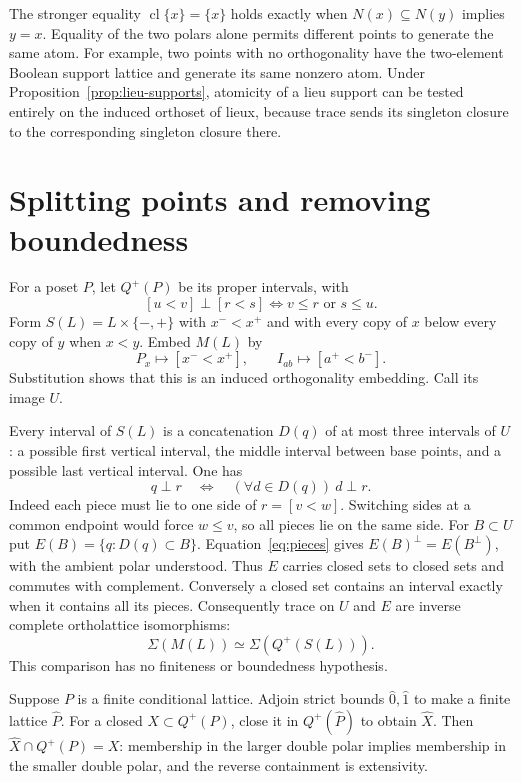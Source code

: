 \documentclass[11pt,a4paper]{article}
\theoremstyle{definition}
\newcommand{\cl}{\operatorname{cl}}
\begin{document}
The stronger equality $\cl\{x\}=\{x\}$ holds exactly when
$N(x)\subseteq N(y)$ implies $y=x$. Equality of the two polars
alone permits different points to generate the same atom.
For example, two points with no orthogonality have the two-element
Boolean support lattice and generate its same nonzero atom.
Under Proposition~\ref{prop:lieu-supports}, atomicity of a lieu
support can be tested entirely on the induced orthoset of lieux,
because trace sends its singleton closure to the corresponding
singleton closure there.

\section{Splitting points and removing boundedness}
For a poset $P$, let $Q^+(P)$ be its proper intervals, with
\[
 [u<v]\perp[r<s]\iff v\le r\text{ or }s\le u.
\]
Form $S(L)=L\times\{-,+\}$ with $x^-<x^+$ and with every copy of $x$ below every copy of $y$ when $x<y$. Embed $M(L)$ by
\[
 P_x\mapsto[x^-<x^+],\qquad I_{ab}\mapsto[a^+<b^-].
\]
Substitution shows that this is an induced orthogonality embedding. Call its image $U$.

Every interval of $S(L)$ is a concatenation $D(q)$ of at most three intervals of $U$: a possible first vertical interval, the middle interval between base points, and a possible last vertical interval. One has
\begin{equation}\label{eq:pieces}
 q\perp r\quad\Longleftrightarrow\quad(\forall d\in D(q))\ d\perp r.
\end{equation}
Indeed each piece must lie to one side of $r=[v<w]$. Switching sides at a common endpoint would force $w\le v$, so all pieces lie on the same side. For $B\subset U$ put $E(B)=\{q:D(q)\subset B\}$. Equation~\eqref{eq:pieces} gives $E(B)^\perp=E(B^\perp)$, with the ambient polar understood. Thus $E$ carries closed sets to closed sets and commutes with complement. Conversely a closed set contains an interval exactly when it contains all its pieces. Consequently trace on $U$ and $E$ are inverse complete ortholattice isomorphisms:
\[
 \Sigma(M(L))\simeq\Sigma(Q^+(S(L))).
\]
This comparison has no finiteness or boundedness hypothesis.

Suppose $P$ is a finite conditional lattice. Adjoin strict bounds $\widehat0,\widehat1$ to make a finite lattice $\widehat P$. For a closed $X\subset Q^+(P)$, close it in $Q^+(\widehat P)$ to obtain $\widehat X$. Then $\widehat X\cap Q^+(P)=X$: membership in the larger double polar implies membership in the smaller double polar, and the reverse containment is extensivity.
\end{document}
